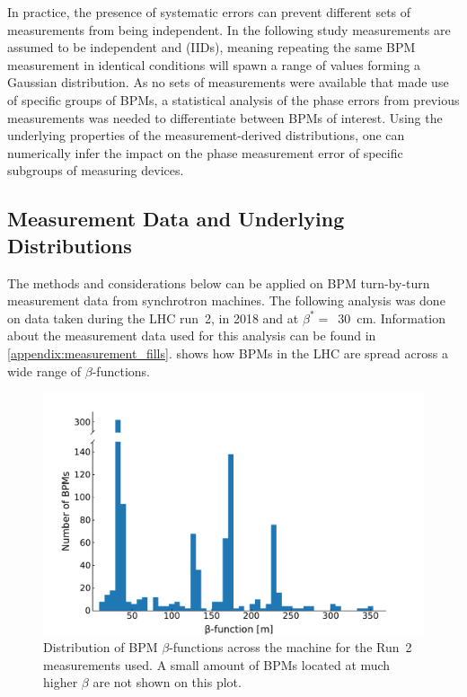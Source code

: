 In practice, the presence of systematic errors can prevent different sets of measurements from being independent.
In the following study measurements are assumed to be independent and  (IIDs), meaning repeating the same BPM measurement in identical conditions will spawn a range of values forming a Gaussian distribution.
As no sets of measurements were available that made use of specific groups of BPMs, a statistical analysis of the phase errors from previous measurements was needed to differentiate between BPMs of interest. 
Using the underlying properties of the measurement-derived distributions, one can numerically infer the impact on the phase measurement error of specific subgroups of measuring devices.

\subsection*{Measurement Data and Underlying Distributions}

The methods and considerations below can be applied on BPM turn-by-turn measurement data from synchrotron machines.
The following analysis was done on data taken during the LHC \Gls{run}~\num{2}, in \num{2018} and at \(\beta^{\ast} =\)~\qty{30}{\centi\meter}.
Information about the measurement data used for this analysis can be found in \cref{appendix:measurement_fills}.
 shows how BPMs in the LHC are spread across a wide range of \(\beta\)-functions.

\begin{figure}[!htb]
    \centering
    \includegraphics*[width=\textwidth]{Figures/Other_Studies/bpms_betas_histogram.pdf}
    \caption{Distribution of BPM \(\beta\)-functions across the machine for the Run~\num{2} measurements used. A small amount of BPMs located at much higher \(\beta\) are not shown on this plot.}
    \label{figure:bpms_betas_histogram}
\end{figure}

